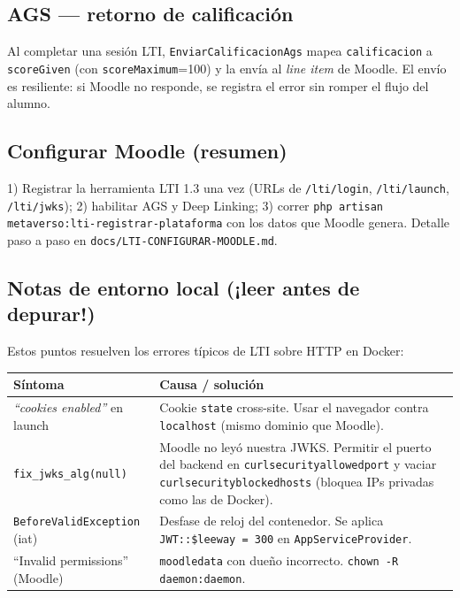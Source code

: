 \documentclass[11pt,letterpaper]{article}
\begin{document}
\subsection{AGS — retorno de calificación}
Al completar una sesión LTI, \texttt{EnviarCalificacionAgs} mapea
\texttt{calificacion} a \texttt{scoreGiven} (con \texttt{scoreMaximum}=100) y la
envía al \emph{line item} de Moodle. El envío es resiliente: si Moodle no
responde, se registra el error sin romper el flujo del alumno.

\subsection{Configurar Moodle (resumen)}
1) Registrar la herramienta LTI 1.3 una vez (URLs de \texttt{/lti/login},
\texttt{/lti/launch}, \texttt{/lti/jwks}); 2) habilitar AGS y Deep Linking; 3)
correr \texttt{php artisan metaverso:lti-registrar-plataforma} con los datos que
Moodle genera. Detalle paso a paso en \texttt{docs/LTI-CONFIGURAR-MOODLE.md}.

\subsection{Notas de entorno local (¡leer antes de depurar!)}
Estos puntos resuelven los errores típicos de LTI sobre HTTP en Docker:
\begin{longtable}{p{5.2cm} p{9.4cm}}
\toprule \textbf{Síntoma} & \textbf{Causa / solución} \\ \midrule
\endhead
\textit{``cookies enabled''} en launch & Cookie \texttt{state} cross-site. Usar el navegador contra \texttt{localhost} (mismo dominio que Moodle). \\
\texttt{fix\_jwks\_alg(null)} & Moodle no leyó nuestra JWKS. Permitir el puerto del backend en \texttt{curlsecurityallowedport} y vaciar \texttt{curlsecurityblockedhosts} (bloquea IPs privadas como las de Docker). \\
\texttt{BeforeValidException} (iat) & Desfase de reloj del contenedor. Se aplica \texttt{JWT::\$leeway = 300} en \texttt{AppServiceProvider}. \\
``Invalid permissions'' (Moodle) & \texttt{moodledata} con dueño incorrecto. \texttt{chown -R daemon:daemon}. \\
\bottomrule
\end{longtable}

\end{document}
